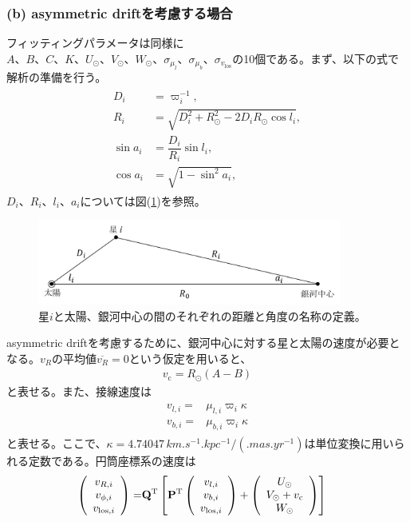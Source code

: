 \subsubsection{(b) asymmetric driftを考慮する場合}
フィッティングパラメータは同様に$A、B、C、K、U_{\odot}、V_{\odot}、W_{\odot}、\sigma_{\mu_l}、\sigma_{\mu_b}、\sigma_{v_{\mathrm{los}}}$の10個である。まず、以下の式で解析の準備を行う。
\begin{align}
\begin{aligned}
	D_i &= \varpi_i^{-1},\\
	R_i &= \sqrt{D_i^2 + R_{\odot}^2 - 2D_iR_{\odot}\cos{l_i}},\\
	\sin{a_i} &= \dfrac{D_i}{R_i}\sin{l_i},\\
	\cos{a_i} &= \sqrt{1 - \sin^2{a_i}},
\end{aligned} \label{eq142}
\end{align}
$D_i、R_i、l_i、a_i$については図(\ref{coor_a})を参照。
\begin{figure}[htbp]
	\centering
	\includegraphics[width=10cm]{fig/coordinate_a2.pdf}
	\caption{星$i$と太陽、銀河中心の間のそれぞれの距離と角度の名称の定義。}
	\label{coor_a}
\end{figure}
asymmetric driftを考慮するために、銀河中心に対する星と太陽の速度が必要となる。$v_R$の平均値$\overline{v_R}=0$という仮定を用いると、
\begin{align}
	v_{\mathrm{c}} = R_{\odot}(A-B) \label{eq153}
\end{align}
と表せる。また、接線速度は
\begin{align}
\begin{aligned}
	v_{l,i} =& \mu_{l,i}\varpi_i \kappa\\
	v_{b,i} =& \mu_{b,i}\varpi_i \kappa
\end{aligned}
\end{align}
と表せる。ここで、$\kappa=4.74047\,\si{km.s^{-1}.kpc^{-1}/(.mas.yr^{-1})}$は単位変換に用いられる定数である。円筒座標系の速度は
\begin{align}
\begin{aligned}
	\left(
	\begin{array}{c}
	 	v_{R,i}\\
		v_{\phi,i}\\
		v_{\mathrm{los},i}
	\end{array}
	\right)
	=& \bf{Q}^{\mathrm{T}} \left[\bf{P}^{\mathrm{T}}
	\left(
	\begin{array}{c}
	 	v_{l,i}\\
		v_{b,i}\\
		v_{\mathrm{los},i}
	\end{array}
	\right)
	+\left(
	\begin{array}{c}
	 	U_{\odot}\\
		V_{\odot} + v_{\mathrm{c}}\\
		W_{\odot}
	\end{array}
	\right)
	\right]
\end{aligned}
\end{align}
